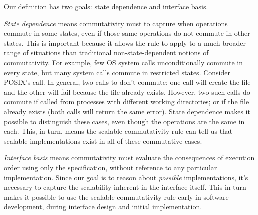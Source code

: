 Our definition has two goals: state dependence and interface basis.

\emph{State dependence} means \SIM commutativity must to capture when
operations commute in some states, even if those same operations do
not commute in other states.
%
This is important because it allows the rule to apply to a much
broader range of
situations than traditional non-state-dependent notions of
commutativity.
%
For example, few OS system calls unconditionally commute in
every state, but many system calls commute in restricted states.
%
Consider POSIX's  call.
%
In general, two calls to  don't
commute: one call will create the file and the other will
fail because the file already exists.
%
However, two such calls do commute if called from processes with
different working directories; or if the file  already
exists (both calls will return the same error).
%
  
%
State dependence makes it possible to distinguish these cases, even
though the
operations are the same in each.  This, in turn, means the scalable
commutativity
rule can tell us that scalable implementations exist in all of these
commutative
cases.
%

\emph{Interface basis} means \SIM commutativity must
evaluate the consequences of execution order using only the
specification, without reference to any particular implementation.
%
Since our goal is to reason about
\emph{possible} implementations, it's necessary to capture the
scalability inherent in the interface
itself.
%
This in turn makes it
possible to use the scalable commutativity rule early in software development,
during interface design and initial implementation.
%

